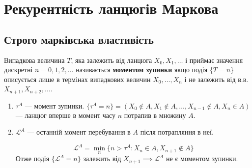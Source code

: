 \section{Рекурентність ланцюгів Маркова}

\subsection{Строго марківська властивість}
\begin{definition}
  Випадкова величина $T$, яка залежить від ланцюга $X_0, X_1, \ldots$ і приймає значення
  дискретні $n=0, 1, 2, \ldots$ називається \textbf{моментом зупинки} якщо подія
  $\{T = n\}$ описується лише в термінах випадкових величин $X_0, \ldots, X_n$ і не
  залежить від в.в. $X_{n+1}, X_{n+2}, \ldots$.
\end{definition}

\begin{example}
  \begin{enumerate}
    \item 
  $\tau^{A}$ --- момент зупинки.
  $ \{\tau^{A} = n\} = \left( X_0 \not\in A, X_1 \not\in A, \ldots,
  X_{n-1}\not\in A, X_n \in A \right) $ --- ланцюг вперше в момент часу $n$ потрапив
  в множину $A$.
  \item
    $\mathcal{L}^{A}$ --- останній момент перебування в $A$ після потрапляння в неї.

    \[ \mathcal{L}^{A} = \min_{n} \{n > \tau^{A} : X_{n} \in A, X_{n+1} \not\in A \} \] 
    Отже подія $\{\mathcal{L}^{A} = n\}$ залежить від $X_{n+1} \implies \mathcal{L}^{A}$
    не є моментом зупинки.
  \end{enumerate}
\end{example}

